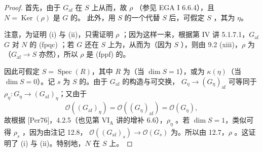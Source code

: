 \begin{proof}
首先，由于 $G_{\mathrm{af}}$ 在 $S$ 上从而，故 $\rho$ （参见 EGA I 6.6.4），且 $N=\operatorname{Ker}(\rho)$ 是 $G$ 的。
此外，用 $S$ 的一个代替 $S$ 后，可假定 $S$ ，其为 $\eta$。

注意，为证明 (i) 与 (ii)，只需证明 $\rho$ ；因为这样一来，根据第 IV 讲 5.1.7.1，$G_{\mathrm{af}}$  $G$ 对 $N$ 的 (fpqc) ；若 $G$ 还在 $S$ 上为，从而为（因为 $S$ ），则由 9.2 (xiii)，$\rho$ 为（$G_{\mathrm{af}}\to S$ 亦然），所以 $\rho$ 是 (fppf) 的。

因此可假定 $S=\operatorname{Spec}(R)$，其中 $R$ 为（当 $\dim S=1$），或为 $\kappa(\eta)$（当 $\dim S=0$）。记 $s$ 为 $S$ 的。由于 $G_{\mathrm{af}}$ 的构造与可交换， $G_\eta\to(G_\eta)_{\mathrm{af}}$ 可等同于 $\rho_\eta:G_\eta\to(G_{\mathrm{af}})_\eta$；又由于
\[
\mathcal O((G_{\mathrm{af}})_\eta)=\mathcal O((G_\eta)_{\mathrm{af}})=\mathcal O(G_\eta),
\]
故根据 [Per76]，4.2.5（也见第 VI$_{\mathrm A}$ 讲的增补 6.6），$\rho_\eta$ 。若 $\dim S=1$，类似可得 $\rho_s$ ，因为由注记 12.8， $\mathcal O((G_{\mathrm{af}})_s)\to\mathcal O(G_s)$ 为。所以由 12.7，$\rho$ 。这证明了 (i) 与 (ii)。特别地，$N$ 在 $S$ 上。


\end{proof}
